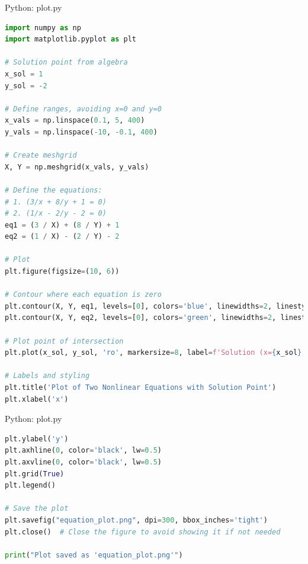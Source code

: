 \documentclass{beamer}
\numberwithin{equation}{section}
\theoremstyle{remark}
\begin{document}
\begin{frame}[fragile]{Python: plot.py}
\begin{lstlisting}[language=Python]
import numpy as np
import matplotlib.pyplot as plt

# Solution point from algebra
x_sol = 1
y_sol = -2

# Define ranges, avoiding x=0 and y=0
x_vals = np.linspace(0.1, 5, 400)
y_vals = np.linspace(-10, -0.1, 400)

# Create meshgrid
X, Y = np.meshgrid(x_vals, y_vals)

# Define the equations:
# 1. (3/x + 8/y + 1 = 0)
# 2. (1/x - 2/y - 2 = 0)
eq1 = (3 / X) + (8 / Y) + 1
eq2 = (1 / X) - (2 / Y) - 2

# Plot
plt.figure(figsize=(10, 6))

# Contour where each equation is zero
plt.contour(X, Y, eq1, levels=[0], colors='blue', linewidths=2, linestyles='solid')
plt.contour(X, Y, eq2, levels=[0], colors='green', linewidths=2, linestyles='solid')

# Plot point of intersection
plt.plot(x_sol, y_sol, 'ro', markersize=8, label=f'Solution (x={x_sol}, y={y_sol})')

# Labels and styling
plt.title('Plot of Two Nonlinear Equations with Solution Point')
plt.xlabel('x')
\end{lstlisting}
\end{frame}

\begin{frame}[fragile]{Python: plot.py}
\begin{lstlisting}[language=Python]
plt.ylabel('y')
plt.axhline(0, color='black', lw=0.5)
plt.axvline(0, color='black', lw=0.5)
plt.grid(True)
plt.legend()

# Save the plot
plt.savefig("equation_plot.png", dpi=300, bbox_inches='tight')
plt.close()  # Close the figure to avoid showing it if not needed

print("Plot saved as 'equation_plot.png'")


\end{lstlisting}
\end{frame}
\end{document}
